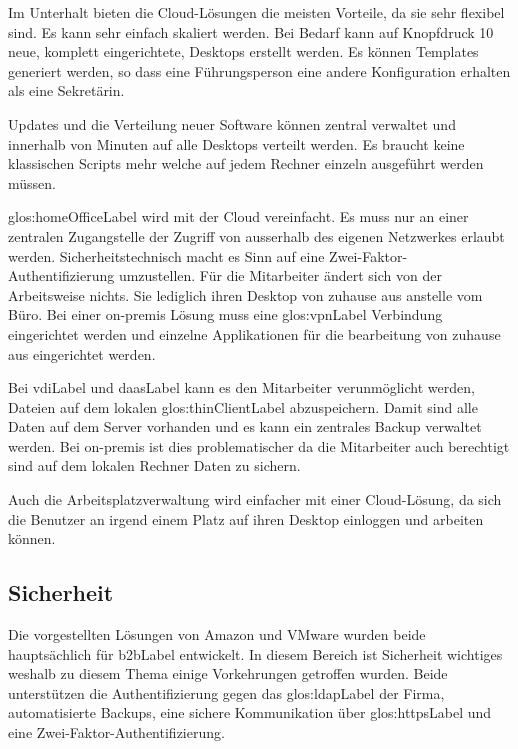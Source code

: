 Im Unterhalt bieten die Cloud-Lösungen die meisten Vorteile, da sie sehr flexibel sind. Es kann sehr einfach skaliert werden. Bei Bedarf kann auf Knopfdruck 10 neue, komplett eingerichtete,  Desktops erstellt werden. Es können Templates generiert werden, so dass eine Führungsperson eine andere Konfiguration erhalten als eine Sekretärin.

Updates und die Verteilung neuer Software können zentral verwaltet und innerhalb von Minuten auf alle Desktops verteilt werden. Es braucht keine klassischen Scripts mehr welche auf jedem Rechner einzeln ausgeführt werden müssen.

\gls{glos:homeOfficeLabel} wird mit der Cloud vereinfacht. Es muss nur an einer zentralen Zugangstelle der Zugriff von ausserhalb des eigenen Netzwerkes erlaubt werden. Sicherheitstechnisch macht es Sinn auf eine Zwei-Faktor-Authentifizierung umzustellen. Für die Mitarbeiter ändert sich von der Arbeitsweise nichts. Sie lediglich ihren Desktop von zuhause aus anstelle vom Büro. Bei einer on-premis Lösung muss eine \gls{glos:vpnLabel} Verbindung eingerichtet werden und einzelne Applikationen für die bearbeitung von zuhause aus eingerichtet werden.

Bei \Gls{vdiLabel} und \Gls{daasLabel} kann es den Mitarbeiter verunmöglicht werden, Dateien auf dem lokalen \gls{glos:thinClientLabel} abzuspeichern. Damit sind alle Daten auf dem Server vorhanden und es kann ein zentrales Backup verwaltet werden. Bei on-premis ist dies problematischer da die Mitarbeiter auch berechtigt sind auf dem lokalen Rechner Daten zu sichern.

Auch die Arbeitsplatzverwaltung wird einfacher mit einer Cloud-Lösung, da sich die Benutzer an irgend einem Platz auf ihren Desktop einloggen und arbeiten können.

\subsection{Sicherheit}
Die vorgestellten Lösungen von Amazon und VMware wurden beide hauptsächlich für \Gls{b2bLabel} entwickelt. In diesem Bereich ist Sicherheit wichtiges weshalb zu diesem Thema einige Vorkehrungen getroffen wurden. Beide unterstützen die Authentifizierung gegen das \gls{glos:ldapLabel} der Firma, automatisierte Backups, eine sichere Kommunikation über \gls{glos:httpsLabel} und eine Zwei-Faktor-Authentifizierung.

